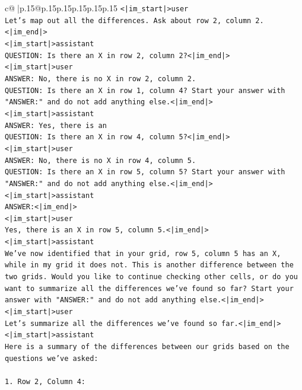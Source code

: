\documentclass{article}
\begin{document}
{\begin{supertabular}{c@{$\;$}|p{.15\linewidth}@{}p{.15\linewidth}p{.15\linewidth}p{.15\linewidth}p{.15\linewidth}p{.15\linewidth}}
{{{\texttt{<|im\_start|>user} \\
\texttt{Let's map out all the differences. Ask about row 2, column 2.<|im\_end|>} \\
\texttt{<|im\_start|>assistant} \\
\texttt{QUESTION: Is there an X in row 2, column 2?<|im\_end|>} \\
\texttt{<|im\_start|>user} \\
\texttt{ANSWER: No, there is no X in row 2, column 2.} \\
\texttt{QUESTION: Is there an X in row 1, column 4? Start your answer with "ANSWER:" and do not add anything else.<|im\_end|>} \\
\texttt{<|im\_start|>assistant} \\
\texttt{ANSWER: Yes, there is an} \\
\texttt{QUESTION: Is there an X in row 4, column 5?<|im\_end|>} \\
\texttt{<|im\_start|>user} \\
\texttt{ANSWER: No, there is no X in row 4, column 5.} \\
\texttt{QUESTION: Is there an X in row 5, column 5? Start your answer with "ANSWER:" and do not add anything else.<|im\_end|>} \\
\texttt{<|im\_start|>assistant} \\
\texttt{ANSWER:<|im\_end|>} \\
\texttt{<|im\_start|>user} \\
\texttt{Yes, there is an X in row 5, column 5.<|im\_end|>} \\
\texttt{<|im\_start|>assistant} \\
\texttt{We've now identified that in your grid, row 5, column 5 has an X, while in my grid it does not. This is another difference between the two grids. Would you like to continue checking other cells, or do you want to summarize all the differences we've found so far? Start your answer with "ANSWER:" and do not add anything else.<|im\_end|>} \\
\texttt{<|im\_start|>user} \\
\texttt{Let's summarize all the differences we've found so far.<|im\_end|>} \\
\texttt{<|im\_start|>assistant} \\
\texttt{Here is a summary of the differences between our grids based on the questions we've asked:} \\
\\ 
\texttt{1. Row 2, Column 4:} \\
}}}
\end{supertabular}}
\end{document}
